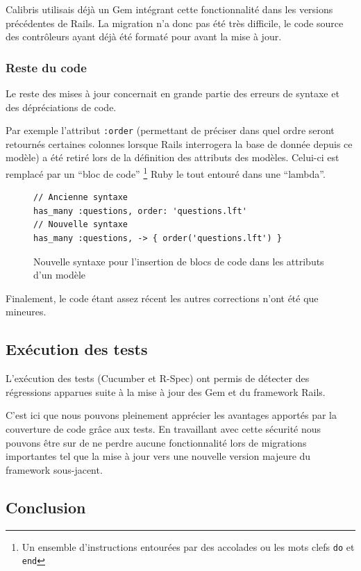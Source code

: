 \documentclass[12pt,a4paper]{book}
\begin{document}
Calibris utilisais déjà un Gem intégrant cette fonctionnalité dans les versions précédentes de Rails. La migration n'a donc pas été très difficile, le code source des contrôleurs ayant déjà été formaté pour avant la mise à jour.
    
\subsubsection{Reste du code}

Le reste des mises à jour concernait en grande partie des erreurs de syntaxe et des dépréciations de code.

Par exemple l'attribut \texttt{:order} (permettant de préciser dans quel ordre seront retournés certaines colonnes lorsque Rails interrogera la base de donnée depuis ce modèle) a été retiré lors de la définition des attributs des modèles. Celui-ci est remplacé par un ``bloc de code'' \footnote{Un ensemble d'instructions entourées par des accolades ou les mots clefs \texttt{do} et \texttt{end}} Ruby le tout entouré dans une ``lambda''.

    \begin{figure}[h]
    \lstset{language=ruby}
    \begin{lstlisting}
// Ancienne syntaxe
has_many :questions, order: 'questions.lft'
// Nouvelle syntaxe
has_many :questions, -> { order('questions.lft') }
    \end{lstlisting}
     \caption{Nouvelle syntaxe pour l'insertion de blocs de code dans les attributs d'un modèle}
    \end{figure}
    
Finalement, le code étant assez récent les autres corrections n'ont été que mineures.

\subsection{Exécution des tests}

L'exécution des tests (Cucumber et R-Spec) ont permis de détecter des régressions apparues suite à la mise à jour des Gem et du framework Rails.

C'est ici que nous pouvons pleinement apprécier les avantages apportés par la couverture de code grâce aux tests. En travaillant avec cette sécurité nous pouvons être sur de ne perdre aucune fonctionnalité lors de migrations importantes tel que la mise à jour vers une nouvelle version majeure du framework sous-jacent.

\subsection*{Conclusion}
\end{document}
